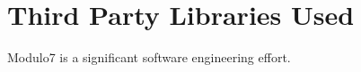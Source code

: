 \appendix
{}
\chapter{Third Party Libraries Used}

\noindent Modulo7 is a significant software engineering effort.